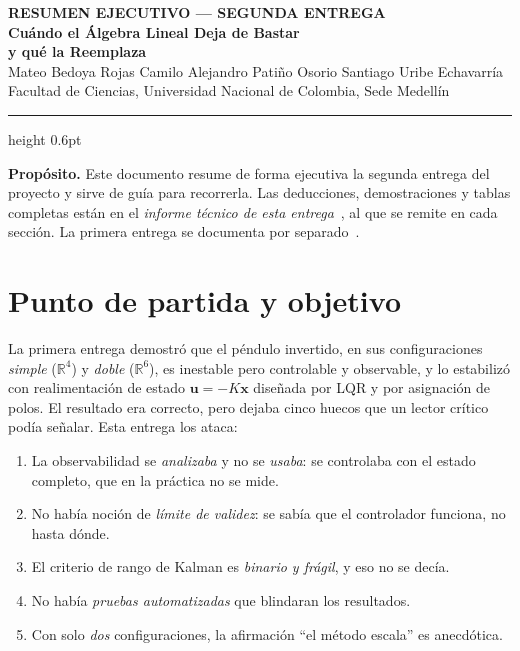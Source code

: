 \documentclass[11pt,letterpaper]{article}
\newcommand{\R}{\mathbb{R}}
\newcommand{\xv}{\bm{x}}
\newcommand{\uv}{\bm{u}}
\begin{document}
\begin{center}
    {\footnotesize\bfseries\color{acento2} RESUMEN EJECUTIVO --- SEGUNDA ENTREGA}\\[0.4em]
    {\LARGE\bfseries Cuándo el Álgebra Lineal Deja de Bastar \\[0.15em]
     y qué la Reemplaza}\\[0.6em]
    {\normalsize Mateo Bedoya Rojas \quad\textbullet\quad Camilo Alejandro Patiño Osorio \quad\textbullet\quad Santiago Uribe Echavarría}\\[0.3em]
    {\footnotesize Facultad de Ciencias, Universidad Nacional de Colombia, Sede Medellín}
\end{center}
\vspace{0.2em}
\hrule height 0.6pt
\vspace{0.8em}

\noindent
\begin{clave}
\small
\textbf{Propósito.} Este documento resume de forma ejecutiva la segunda entrega
del proyecto y sirve de guía para recorrerla. Las deducciones, demostraciones y
tablas completas están en el \emph{informe técnico de esta
entrega}~\cite{tecnico2}, al que se remite en cada sección. La primera entrega
se documenta por separado~\cite{tecnico1}.
\end{clave}

\section{Punto de partida y objetivo}

La primera entrega demostró que el péndulo invertido, en sus configuraciones
\emph{simple} ($\R^4$) y \emph{doble} ($\R^6$), es inestable pero controlable y
observable, y lo estabilizó con realimentación de estado $\uv=-K\xv$ diseñada
por LQR y por asignación de polos. El resultado era correcto, pero dejaba cinco
huecos que un lector crítico podía señalar. Esta entrega los ataca:

\begin{enumerate}
  \item La observabilidad se \emph{analizaba} y no se \emph{usaba}: se controlaba
  con el estado completo, que en la práctica no se mide.
  \item No había noción de \emph{límite de validez}: se sabía que el controlador
  funciona, no hasta dónde.
  \item El criterio de rango de Kalman es \emph{binario y frágil}, y eso no se
  decía.
  \item No había \emph{pruebas automatizadas} que blindaran los resultados.
  \item Con solo \emph{dos} configuraciones, la afirmación ``el método escala''
  es anecdótica.
\end{enumerate}
\end{document}
